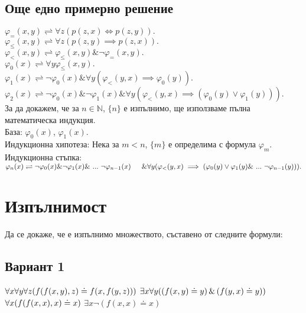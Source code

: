 \documentclass{article}
\begin{document}
\subsection{Още едно примерно решение}
$ \varphi_{=}(x, y) \rightleftharpoons \forall z (p(z, x) \Leftrightarrow p(z, y)). $\\
$ \varphi_{\leq}(x, y) \rightleftharpoons \forall z (p(z, y) \implies p(z, x)).$\\
$ \varphi_{<}(x, y) \rightleftharpoons \varphi_{\leq}(x, y) \& \lnot \varphi_{=}(x, y).$\\
$ \varphi_{0}(x) \rightleftharpoons \forall y  \varphi_{\leq}(x, y). $\\
$ \varphi_{1}(x) \rightleftharpoons \lnot \varphi_{0}(x) \& \forall y  (\varphi_{<}(y, x) \implies \varphi_{0}(y)). $\\
$ \varphi_{2}(x) \rightleftharpoons  \lnot \varphi_{0}(x) \& \lnot \varphi_{1}(x) \& \forall y  (\varphi_{<}(y, x) \implies (\varphi_{0}(y) \lor \varphi_{1}(y))). $\\

За да докажем, че за $n \in \mathbb{N}$,  $\{n\}$ е изпълнимо, ще използваме пълна математическа индукция. \\
База: $\varphi_{0}(x)$, $\varphi_{1}(x)$. \\
Индукционна хипотеза: Нека за $m <n $, $\{m\}$ е определима с формула $\varphi_{m}$. \\
Индукционна стъпка: $ \varphi_{n}(x) \rightleftharpoons \lnot \varphi_{0}(x) \& \lnot \varphi_{1}(x) \&\ ... \ \lnot \varphi_{n-1}(x) \\ \indent \& \forall y  (\varphi_{<}(y, x) \implies (\varphi_{0}(y) \lor \varphi_{1}(y) \&\ ... \ \lnot \varphi_{n-1}(y) )). $\\


\newpage
\section{Изпълнимост}
Да се докаже, че е изпълнимо множеството, съставено от следните формули:

\subsection{Вариант 1}

$\forall x\forall y\forall z (f(f(x,y),z) \doteq  f(x,f(y,z)))\\$
$\exists x \forall y ((f(x,y) \doteq y)\, \& \,(f(y,x) \doteq y))\\$
$\forall x(f(f(x,x),x) \doteq x) \\$
$\exists x \lnot(f(x,x)\doteq x)$
\end{document}
